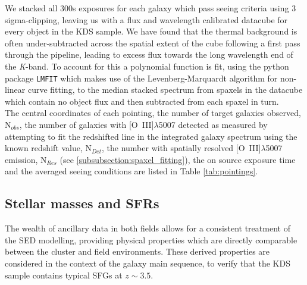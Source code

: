 \documentclass[fleqn,usenatbib]{mn2e}
\begin{document}
We stacked all 300s exposures for each galaxy which pass seeing criteria using 3 sigma-clipping, leaving us with a flux and wavelength calibrated datacube for every object in the KDS sample.
We have found that the thermal background is often under-subtracted across the spatial extent of the cube following a first pass through the pipeline, leading to excess flux towards the long wavelength end of the {\it K}-band.
To account for this a polynomial function is fit, using the python package {\tt LMFIT} \citep{Newville2014} which makes use of the Levenberg-Marquardt algorithm for non-linear curve fitting, to the median stacked spectrum from spaxels in the datacube which contain no object flux and then subtracted from each spaxel in turn. \\

The central coordinates of each pointing, the number of target galaxies observed, N$_{obs}$, the number of galaxies with [O~{\sc III}]$\lambda$5007 detected as measured by attempting to fit the redshifted line in the integrated galaxy spectrum using the known redshift value, N$_{Det}$, the number with spatially resolved [O~{\sc III}]$\lambda$5007 emission, N$_{Res}$ (see \cref{subsubsection:spaxel_fitting}), the on source exposure time and the averaged seeing conditions are listed in Table \ref{tab:pointings}.

\subsection{Stellar masses and SFRs}\label{subsec:stellar_masses_and_sfrs}
The wealth of ancillary data in both fields allows for a consistent treatment of the SED modelling, providing physical properties which are directly comparable between the cluster and field environments.
These derived properties are considered in the context of the galaxy main sequence, to verify that the KDS sample contains typical SFGs at $z\sim3.5$.   
\end{document}
